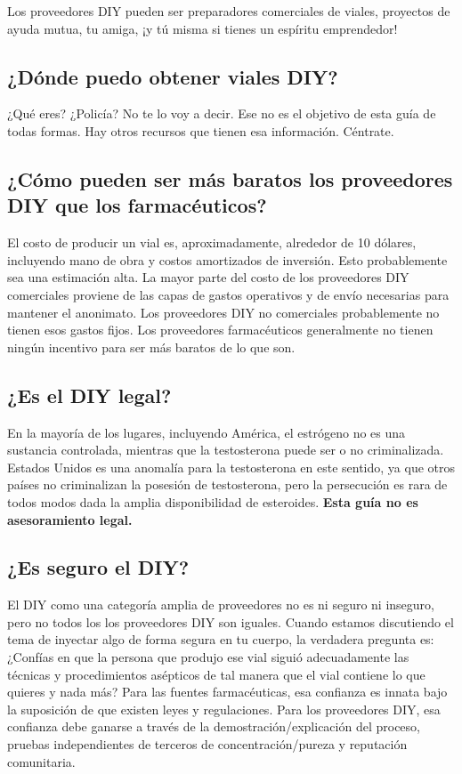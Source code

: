 \documentclass{article}
\begin{document}
Los proveedores DIY pueden ser preparadores comerciales de viales, proyectos de ayuda mutua, tu amiga, ¡y tú misma si tienes un espíritu emprendedor!

\subsection{¿Dónde puedo obtener viales DIY?}

¿Qué eres? ¿Policía? No te lo voy a decir. Ese no es el objetivo de esta guía de todas formas. Hay otros recursos que tienen esa información. Céntrate.

\subsection{¿Cómo pueden ser más baratos los proveedores DIY que los farmacéuticos?}

El costo de producir un vial es, aproximadamente, alrededor de 10 dólares, incluyendo mano de obra y costos amortizados de inversión. Esto probablemente sea una estimación alta. La mayor parte del costo de los proveedores DIY comerciales proviene de las capas de gastos operativos y de envío necesarias para mantener el anonimato. Los proveedores DIY no comerciales probablemente no tienen esos gastos fijos. Los proveedores farmacéuticos generalmente no tienen ningún incentivo para ser más baratos de lo que son.

\subsection{¿Es el DIY legal?}\label{6-11}

En la mayoría de los lugares, incluyendo América, el estrógeno no es una sustancia controlada, mientras que la testosterona puede ser o no criminalizada. Estados Unidos es una anomalía para la testosterona en este sentido, ya que otros países no criminalizan la posesión de testosterona, pero la persecución es rara de todos modos dada la amplia disponibilidad de esteroides. \textbf{Esta guía no es asesoramiento legal.}

\subsection{¿Es seguro el DIY?}

El DIY como una categoría amplia de proveedores no es ni seguro ni inseguro, pero no todos los los proveedores DIY son iguales. Cuando estamos discutiendo el tema de inyectar algo de forma segura en tu cuerpo, la verdadera pregunta es: ¿Confías en que la persona que produjo ese vial siguió adecuadamente las técnicas y procedimientos asépticos de tal manera que el vial contiene lo que quieres y nada más? Para las fuentes farmacéuticas, esa confianza es innata bajo la suposición de que existen leyes y regulaciones. Para los proveedores DIY, esa confianza debe ganarse a través de la demostración/explicación del proceso, pruebas independientes de terceros de concentración/pureza y reputación comunitaria.
\end{document}
